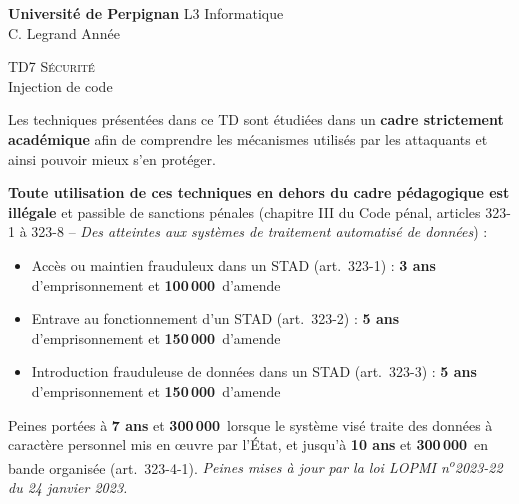 \documentclass[a4paper,11pt]{article}
\theoremstyle{plain}
\theoremstyle{definition}
\begin{document}
\hbox{}
\noindent \textbf{Université de Perpignan} \hfill  L3 Informatique \\
 \hfill C. Legrand \hfill  Année \the\year \\
\smallskip
\begin{center}
{
  {\scshape \large TD7 Sécurité}  \\
 Injection de code
}
\end{center}
\hbox{}

\bigskip

\begin{ethique}
Les techniques présentées dans ce TD sont étudiées dans un \textbf{cadre strictement académique} afin de comprendre les mécanismes utilisés par les attaquants et ainsi pouvoir mieux s'en protéger.

\textbf{Toute utilisation de ces techniques en dehors du cadre pédagogique est illégale} et passible de sanctions pénales (chapitre III du Code pénal, articles 323-1 à 323-8 -- \textit{Des atteintes aux systèmes de traitement automatisé de données}) :
\begin{itemize}
    \item Accès ou maintien frauduleux dans un STAD (art.~323-1) : \textbf{3 ans} d'emprisonnement et \textbf{100\,000\,\texteuro{}} d'amende
    \item Entrave au fonctionnement d'un STAD (art.~323-2) : \textbf{5 ans} d'emprisonnement et \textbf{150\,000\,\texteuro{}} d'amende
    \item Introduction frauduleuse de données dans un STAD (art.~323-3) : \textbf{5 ans} d'emprisonnement et \textbf{150\,000\,\texteuro{}} d'amende
\end{itemize}
Peines portées à \textbf{7 ans} et \textbf{300\,000\,\texteuro{}} lorsque le système visé traite des données à caractère personnel mis en \oe uvre par l'État, et jusqu'à \textbf{10 ans} et \textbf{300\,000\,\texteuro{}} en bande organisée (art.~323-4-1). \textit{Peines mises à jour par la loi LOPMI n\textsuperscript{o}2023-22 du 24 janvier 2023.}
\end{ethique}

\bigskip
\end{document}
